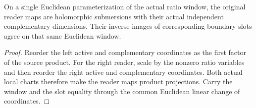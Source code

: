 \begin{theorem}
\label{hir:g1-actual-relative-euclidean-submersions}
\leanok
On a single Euclidean parameterization of the actual ratio
window, the original reader maps are holomorphic submersions
with their actual independent complementary dimensions.
Their inverse images of corresponding boundary slots agree
on that same Euclidean window.
\end{theorem}
\begin{proof}
Reorder the left active and complementary coordinates as
the first factor of the source product. For the right reader,
scale by the nonzero ratio variables and then reorder the
right active and complementary coordinates. Both actual
local charts therefore make the reader maps product
projections. Carry the window and the slot equality through
the common Euclidean linear change of coordinates.
\end{proof}


